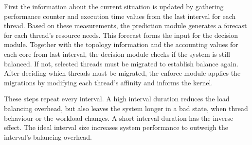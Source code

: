 First the information about the current situation is updated by gathering
performance counter and execution time values from the last interval for each
thread.
Based on these measurements, the prediction module generates a forecast for
each thread's resource needs.
This forecast forms the input for the decision module.
Together with the topology information and the accounting values for each core
from last interval, the decision module checks if the system is still balanced.
If not, selected threads must be migrated to establish balance again.
After deciding which threads must be migrated, the enforce module applies the
migrations by modifying each thread's affinity and informs the kernel.

These steps repeat every interval. A high interval duration reduces the
load balancing overhead, but also leaves the system longer in a bad state, when
thread behaviour or the workload changes.
A short interval duration has the inverse effect.
The ideal interval size increases system performance to outweigh the interval's
balancing overhead.



